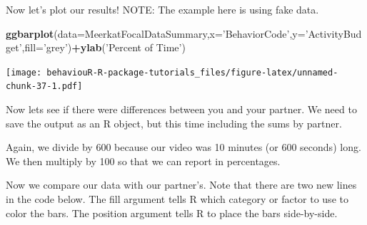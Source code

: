 \documentclass[]{book}
\newenvironment{Shaded}{\begin{snugshade}}{\end{snugshade}}
\newcommand{\DataTypeTok}[1]{\textcolor[rgb]{0.13,0.29,0.53}{#1}}
\newcommand{\DecValTok}[1]{\textcolor[rgb]{0.00,0.00,0.81}{#1}}
\newcommand{\KeywordTok}[1]{\textcolor[rgb]{0.13,0.29,0.53}{\textbf{#1}}}
\newcommand{\NormalTok}[1]{#1}
\newcommand{\OperatorTok}[1]{\textcolor[rgb]{0.81,0.36,0.00}{\textbf{#1}}}
\newcommand{\StringTok}[1]{\textcolor[rgb]{0.31,0.60,0.02}{#1}}
\begin{document}
Now let's plot our results!
NOTE: The example here is using fake data.

\begin{Shaded}
\begin{Highlighting}[]
\KeywordTok{ggbarplot}\NormalTok{(}\DataTypeTok{data=}\NormalTok{MeerkatFocalDataSummary,}\DataTypeTok{x=}\StringTok{'BehaviorCode'}\NormalTok{,}\DataTypeTok{y=}\StringTok{'ActivityBudget'}\NormalTok{,}\DataTypeTok{fill=}\StringTok{'grey'}\NormalTok{)}\OperatorTok{+}\KeywordTok{ylab}\NormalTok{(}\StringTok{'Percent of Time'}\NormalTok{)}
\end{Highlighting}
\end{Shaded}

\texttt{[image: behaviouR-R-package-tutorials\_files/figure-latex/unnamed-chunk-37-1.pdf]}

Now lets see if there were differences between you and your partner. We need to save the output as an R object, but this time including the sums by partner.

\begin{Shaded}
\end{Shaded}

Again, we divide by 600 because our video was 10 minutes (or 600 seconds) long. We then multiply by 100 so that we can report in percentages.

\begin{Shaded}
\end{Shaded}

Now we compare our data with our partner's. Note that there are two new lines in the code below. The fill argument tells R which category or factor to use to color the bars. The position argument tells R to place the bars side-by-side.
\end{document}
